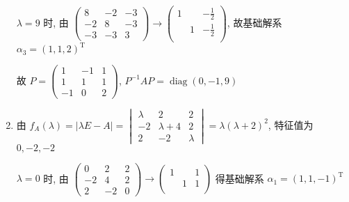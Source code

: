 \begin{enumerate}
                   \( \lambda = 9 \) 时, 由 \( \begin{pmatrix}
                       8  & -2 & -3 \\
                       -2 & 8  & -3 \\
                       -3 & -3 & 3
                   \end{pmatrix} \rightarrow \begin{pmatrix}
                       1 &   & -\frac{1}{2} \\
                         & 1 & -\frac{1}{2} \\
                         &   &
                   \end{pmatrix} \), 故基础解系 \( \alpha_{3} = (1, 1, 2)^{\mathrm{T}} \)

                   故 \( P = \begin{pmatrix}
                       1  & -1 & 1 \\
                       1  & 1  & 1 \\
                       -1 & 0  & 2
                   \end{pmatrix} \), \( P^{-1}AP = \operatorname{diag}(0, -1, 9) \)
             \item %
                   由 \( f_{A}(\lambda) = |\lambda E - A| = \begin{vmatrix}
                       \lambda & 2           & 2       \\
                       -2      & \lambda + 4 & 2       \\
                       2       & -2          & \lambda
                   \end{vmatrix} = \lambda(\lambda + 2)^{2} \), 特征值为 \( 0, -2, -2 \)

                   \( \lambda = 0 \) 时, 由 \( \begin{pmatrix}
                       0  & 2  & 2 \\
                       -2 & 4  & 2 \\
                       2  & -2 & 0
                   \end{pmatrix} \rightarrow \begin{pmatrix}
                       1 &   & 1 \\
                         & 1 & 1 \\
                         &   &
                   \end{pmatrix} \) 得基础解系 \( \alpha_{1} = (1, 1, -1)^{\mathrm{T}} \)


\end{enumerate}
